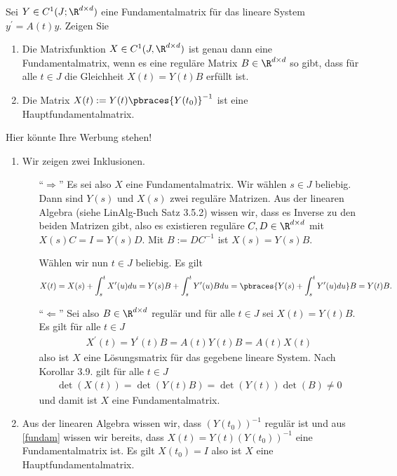 \begin{exercise}
    Sei $Y \in C^1(J; \R^{d \times d})$ eine Fundamentalmatrix für das lineare System $y^\prime = A(t) y$. Zeigen Sie
    \begin{enumerate}[label = \alph*)]
        \item Die Matrixfunktion $X \in C^1(J, \R^{d \times d})$ ist genau dann eine Fundamentalmatrix, wenn es eine reguläre Matrix $B \in \R^{d \times d}$ so gibt, dass für alle $t \in J$ die Gleichheit $X(t) = Y(t)B$ erfüllt ist.
        \item Die Matrix $X(t) := Y(t) \pbraces{Y(t_0)}^{-1}$ ist eine Hauptfundamentalmatrix.
    \end{enumerate}
\end{exercise}

\begin{solution}
    Hier könnte Ihre Werbung stehen!
    \begin{enumerate}[label = \alph*)]
        \item \label{fundam} Wir zeigen zwei Inklusionen.
        \begin{enumerate}
            \item[``$\Rightarrow$''] Es sei also $X$ eine Fundamentalmatrix. Wir wählen $s \in J$ beliebig. Dann sind $Y(s)$ und $X(s)$ zwei reguläre Matrizen. Aus der linearen Algebra (siehe LinAlg-Buch Satz 3.5.2) wissen wir, dass es Inverse zu den beiden Matrizen gibt, also es existieren reguläre $C,D \in \R^{d \times d}$ mit $X(s) C = I = Y(s) D$. Mit $B := D C^{-1}$ ist $X(s) = Y(s) B$.
            
            Wählen wir nun $t \in J$ beliebig. Es gilt
            \begin{align*}
                X(t) = X(s) + \int_s^t X^\prime(u) du = Y(s) B + \int_s^t Y^\prime(u) B du = \pbraces{Y(s) + \int_s^t Y^\prime(u) du} B = Y(t) B.
            \end{align*}
            \item[``$\Leftarrow$''] Sei also $B \in \R^{d \times d}$ regulär und für alle $t \in J$ sei $X(t) = Y(t)B$. Es gilt für alle $t \in J$
            \begin{align*}
                X^\prime(t) = Y^\prime(t) B = A(t) Y(t) B = A(t) X(t)
            \end{align*}  
            also ist $X$ eine Lösungsmatrix für das gegebene lineare System. Nach Korollar 3.9. gilt für alle $t \in J$
            \begin{align*}
                \det(X(t)) = \det(Y(t)B) = \det(Y(t)) \det(B) \neq 0
            \end{align*}
            und damit ist $X$ eine Fundamentalmatrix.
        \end{enumerate}
        \item Aus der linearen Algebra wissen wir, dass $(Y(t_0))^{-1}$ regulär ist und aus \ref{fundam} wissen wir bereits, dass $X(t) = Y(t) (Y(t_0))^{-1}$ eine Fundamentalmatrix ist. Es gilt $X(t_0) = I$ also ist $X$ eine Hauptfundamentalmatrix.
    \end{enumerate}
\end{solution}